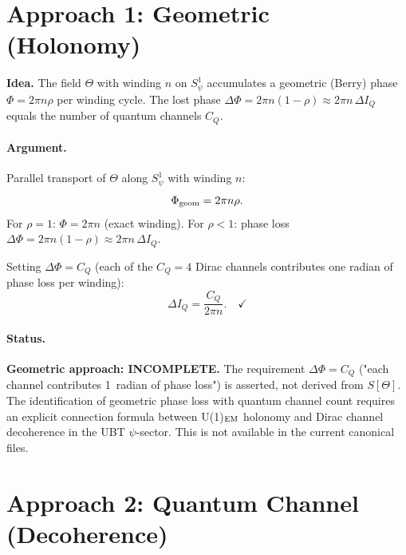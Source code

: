 \documentclass[12pt,a4paper]{article}
\theoremstyle{definition}\newtheorem{definition}[theorem]{Definition}
\theoremstyle{remark}\newtheorem{remark}[theorem]{Remark}
\begin{document}
\section{Approach 1: Geometric (Holonomy)}
\label{sec:holonomy}

\begin{insightbox}
\textbf{Idea.}
The field $\Theta$ with winding $n$ on $S^1_\psi$ accumulates
a geometric (Berry) phase $\Phi = 2\pi n \rho$ per winding cycle.
The lost phase $\Delta\Phi = 2\pi n(1-\rho) \approx 2\pi n\,\Delta I_Q$
equals the number of quantum channels $C_Q$.
\end{insightbox}

\paragraph{Argument.}
Parallel transport of $\Theta$ along $S^1_\psi$ with winding $n$:
\[
  \Phi_{\rm geom} = 2\pi n \rho.
\]
For $\rho = 1$: $\Phi = 2\pi n$ (exact winding). For $\rho < 1$:
phase loss $\Delta\Phi = 2\pi n(1-\rho) \approx 2\pi n\,\Delta I_Q$.

Setting $\Delta\Phi = C_Q$ (each of the $C_Q = 4$ Dirac channels
contributes one radian of phase loss per winding):
\[
  \Delta I_Q = \frac{C_Q}{2\pi n}. \quad \checkmark
\]

\paragraph{Status.}
\begin{deadendbox}
\textbf{Geometric approach: INCOMPLETE.}
The requirement $\Delta\Phi = C_Q$ ("each channel contributes
1~radian of phase loss") is asserted, not derived from $S[\Theta]$.
The identification of geometric phase loss with quantum channel count
requires an explicit connection formula between U(1)$_{\rm EM}$ holonomy
and Dirac channel decoherence in the UBT $\psi$-sector.
This is not available in the current canonical files.
\end{deadendbox}

\section{Approach 2: Quantum Channel (Decoherence)}
\label{sec:channel}
\end{document}
